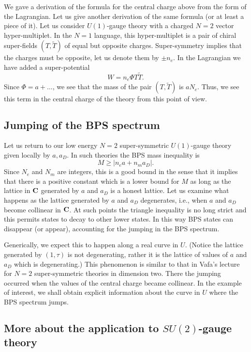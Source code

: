 \documentclass[10pt]{article}
\begin{document}
We gave a derivation of the formula for the central charge above from
the form of the Lagrangian.  Let us give another derivation of the
same formula (or at least a piece of it). Let us consider $U(1)$-gauge
theory with a charged $N=2$ vector hyper-multiplet. In the $N=1$
language, this hyper-multiplet is a pair of chiral super-fields
$(T,\tilde T)$ of equal but opposite charges.  Super-symmetry implies
that the charges must be opposite, let us denote them by  $\pm
n_e$. In the Lagrangian we have added a 
super-potential  
$$W=n_e\Phi T\tilde T.$$ 
Since $\Phi=a+\ldots$, we see that the mass of the pair $(T,\tilde T)$
is $aN_e$. 
Thus, we see this term in the central charge of the theory from this
point of view.


\subsection{Jumping of the BPS spectrum}

Let us return to our low energy $N=2$ super-symmetric $U(1)$-gauge
theory given locally by $a,a_D$. 
In such theories the BPS mass inequality is
$$M\ge |n_ea+n_ma_D|.$$
Since  $N_e$ and $N_m$ are
integers, this is a good bound in the sense that it implies that there
is a positive constant which is a lower bound for $M$ as long as the
lattice in ${\bf C}$ generated by $a$ and $a_D$ is a honest lattice.
Let us examine what happens as the lattice  generated by
$a$ and $a_D$ degenerates, i.e., when $a$ and $a_D$ become collinear in
${\bf C}$.  
At such points the triangle inequality is no long strict and this
permits states to decay to other lower states.  In this way BPS states can
disappear (or appear), accounting for the jumping in the BPS spectrum.

 Generically, we expect this to happen along a real curve in
$U$. (Notice the lattice generated by $(1,\tau)$ is not degenerating,
rather it is the lattice of values of $a$ and $a_D$ which is
degenerating.) 
This phenomenon is similar to that in Vafa's lecture for $N=2$
super-symmetric theories in dimension two. There the jumping occurred
when the values of the central charge became collinear. 
In the example of interest, we shall obtain explicit information about
the curve in  $U$ where the BPS spectrum jumps.



\subsection{More about the application to $SU(2)$-gauge theory}
\end{document}
